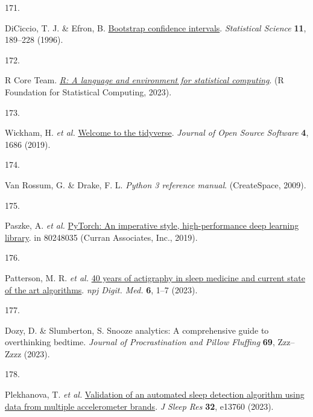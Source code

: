 \documentclass[
  10pt,
]{scrbook}
\newlength{\cslhangindent}
\newlength{\csllabelwidth}
\newlength{\cslentryspacingunit} %
\newenvironment{CSLReferences}[2] %
 {%
  \setlength{\parindent}{0pt}
  \ifodd #1
  \let\oldpar\par
  \def\par{\hangindent=\cslhangindent\oldpar}
  \fi
  \setlength{\parskip}{#2\cslentryspacingunit}
 }%
 {}
\newcommand{\CSLLeftMargin}[1]{\parbox[t]{\csllabelwidth}{#1}}
\newcommand{\CSLRightInline}[1]{\parbox[t]{\linewidth - \csllabelwidth}{#1}\break}
\let\originaltextbf\textbf
\renewcommand{\textbf}[1]{\textcolor{color1}{\textsf{\originaltextbf{#1}}}}
\begin{document}
\begin{CSLReferences}{0}{0}
\leavevmode{}%
\CSLLeftMargin{171. }%
\CSLRightInline{DiCiccio, T. J. \& Efron, B.
\href{https://doi.org/10.1214/ss/1032280214}{Bootstrap confidence
intervals}. \emph{Statistical Science} \textbf{11}, 189--228 (1996).}

\leavevmode{}%
\CSLLeftMargin{172. }%
\CSLRightInline{R Core Team. \emph{\href{https://www.R-project.org/}{R:
A language and environment for statistical computing}}. (R Foundation
for Statistical Computing, 2023).}

\leavevmode{}%
\CSLLeftMargin{173. }%
\CSLRightInline{Wickham, H. \emph{et al.}
\href{https://doi.org/10.21105/joss.01686}{Welcome to the tidyverse}.
\emph{Journal of Open Source Software} \textbf{4}, 1686 (2019).}

\leavevmode{}%
\CSLLeftMargin{174. }%
\CSLRightInline{Van Rossum, G. \& Drake, F. L. \emph{Python 3 reference
manual}. (CreateSpace, 2009).}

\leavevmode{}%
\CSLLeftMargin{175. }%
\CSLRightInline{Paszke, A. \emph{et al.}
\href{http://papers.neurips.cc/paper/9015-pytorch-an-imperative-style-high-performance-deep-learning-library.pdf}{PyTorch:
An imperative style, high-performance deep learning library}. in
80248035 (Curran Associates, Inc., 2019).}

\leavevmode{}%
\CSLLeftMargin{176. }%
\CSLRightInline{Patterson, M. R. \emph{et al.}
\href{https://doi.org/10.1038/s41746-023-00802-1}{40 years of actigraphy
in sleep medicine and current state of the art algorithms}. \emph{npj
Digit. Med.} \textbf{6}, 1--7 (2023).}

\leavevmode{}%
\CSLLeftMargin{177. }%
\CSLRightInline{Dozy, D. \& Slumberton, S. Snooze analytics: A
comprehensive guide to overthinking bedtime. \emph{Journal of
Procrastination and Pillow Fluffing} \textbf{69}, Zzz--Zzzz (2023).}

\leavevmode{}%
\CSLLeftMargin{178. }%
\CSLRightInline{Plekhanova, T. \emph{et al.}
\href{https://doi.org/10.1111/jsr.13760}{Validation of an automated
sleep detection algorithm using data from multiple accelerometer
brands}. \emph{J Sleep Res} \textbf{32}, e13760 (2023).}


\end{CSLReferences}
\end{document}
